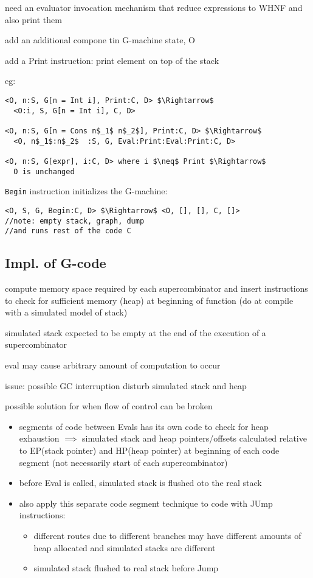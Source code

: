 \documentclass[8pt]{extarticle}
\begin{document}
\begin{multicols*}{2}
need an evaluator invocation mechanism that reduce expressions to WHNF and also print them

add an additional compone tin G-machine state, O

add a Print instruction: print element on top of the stack

eg:

\begin{lstlisting}
<O, n:S, G[n = Int i], Print:C, D> $\Rightarrow$
  <O:i, S, G[n = Int i], C, D>

<O, n:S, G[n = Cons n$_1$ n$_2$], Print:C, D> $\Rightarrow$
  <O, n$_1$:n$_2$  :S, G, Eval:Print:Eval:Print:C, D>

<O, n:S, G[expr], i:C, D> where i $\neq$ Print $\Rightarrow$
  O is unchanged
\end{lstlisting}

\verb|Begin| instruction initializes the G-machine:

\begin{lstlisting}
<O, S, G, Begin:C, D> $\Rightarrow$ <O, [], [], C, []>
//note: empty stack, graph, dump
//and runs rest of the code C
\end{lstlisting}

\subsection{Impl. of G-code}
compute memory space required by each supercombinator and insert instructions to check for sufficient memory (heap) at beginning of function (do at compile with a simulated model of stack)

simulated stack expected to be empty at the end of the execution of a supercombinator

eval may cause arbitrary amount of computation to occur

issue: possible GC interruption disturb simulated stack and heap

possible solution for when flow of control can be broken
\begin{itemize}
\item segments of code between Evals has its own code to check for heap exhaustion $\implies$ simulated stack and heap pointers/offsets calculated relative to EP(stack pointer) and HP(heap pointer) at beginning of each code segment (not necessarily start of each supercombinator)
\item before Eval is called, simulated stack is flushed oto the real stack
\item also apply this separate code segment technique to code with JUmp instructions:
  \begin{itemize}
  \item different routes due to different branches may have different amounts of heap allocated and simulated stacks are different
  \item simulated stack flushed to real stack before Jump
  \end{itemize}
\end{itemize}


\end{multicols*}
\end{document}
